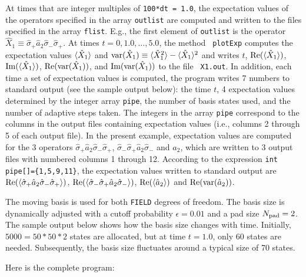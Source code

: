 At times that are integer multiples of {\tt 100*dt = 1.0}, the expectation
values of the operators specified in the array {\tt outlist} are computed and
written to the files specified in the array {\tt flist}. E.g., the first
element of {\tt outlist} is the operator $\hat X_1\equiv\hat\sigma_+\hat
a_2\hat\sigma_-\hat\sigma_+$. At times $t=0,1.0,\ldots,5.0$, the method {\tt
plotExp} computes the expectation values $\langle \hat X_1 \rangle$ and ${\rm
var}(\hat X_1)\equiv\langle \hat X_1^2 \rangle-\langle \hat X_1 \rangle^2$ and writes $t$,
${\rm Re}(\langle \hat X_1 \rangle)$, ${\rm Im}(\langle \hat X_1 \rangle)$, ${\rm Re}({\rm
var}(\hat X_1))$, and ${\rm Im}({\rm var}(\hat X_1))$ to the file {\tt
X1.out}. In addition, each time a set of expectation values is computed, the
program writes 7 numbers to standard output (see the sample output below): the
time $t$, 4 expectation values determined by the integer array {\tt pipe}, the
number of basis states used, and the number of adaptive steps taken. The
integers in the array {\tt pipe} correspond to the columns in the output files
containing expectation values (i.e., columns 2 through 5 of each output file).
In the present example, expectation values are computed for the 3 operators
$\hat\sigma_+\hat a_2\hat\sigma_-\hat\sigma_+$, $\hat\sigma_-\hat\sigma_+\hat
a_2\hat\sigma_-$ and $\hat a_2$, which are written to 3 output files with
numbered columns 1 through 12. According to the expression {\tt int
pipe[]=\{1,5,9,11\}}, the expectation values written to standard output are
${\rm Re}(\langle \hat\sigma_+\hat a_2\hat\sigma_-\hat\sigma_+ \rangle)$, ${\rm
Re}(\langle \hat\sigma_-\hat\sigma_+\hat a_2\hat\sigma_- \rangle)$, ${\rm
Re}(\langle \hat a_2 \rangle)$ and ${\rm Re}({\rm var}(\hat a_2))$.

The moving basis is used for both {\tt FIELD} degrees of freedom. The basis
size is dynamically adjusted with a cutoff probability $\epsilon=0.01$ and a pad
size $N_{\rm pad}=2$. The sample output below shows how the basis size changes
with time. Initially, $5000=50*50*2$ states are allocated, but at time $t=1.0$,
only 60 states are needed. Subsequently, the basis size fluctuates around a
typical size of 70 states.

Here is the complete program:

